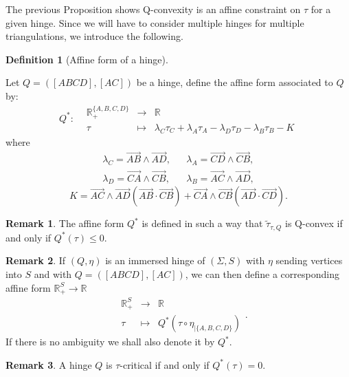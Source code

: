 \documentclass[a4paper,12pt]{article}
\def\RR{\mathbb{R}}
\newcommand{\function}[5]{\displaystyle#1:\begin{array}{l|rcl}
& \displaystyle #2 & \longrightarrow & \displaystyle #3 \\
	& \displaystyle #4 & \longmapsto & \displaystyle #5 \end{array}}
\newcommand{\functionn}[4]{\displaystyle\begin{array}{l|rcl}
& \displaystyle #1 & \longrightarrow & \displaystyle #2 \\
	& \displaystyle #3 & \longmapsto & \displaystyle #4 \end{array}}
\newcommand{\tautilde}[2]{\widetilde\tau_{#1,#2}}
\theoremstyle{definition}
\newtheorem{defi}[lem]{Definition}	%
\newtheorem*{rem}{Remark}			 %
\begin{document}
						The previous Proposition shows Q-convexity is an affine constraint on $\tau$ for a given hinge. Since we will have to consider multiple hinges for multiple triangulations, we introduce the following.
						\begin{defi}[Affine form of a hinge] \label{defi:Q_forme_affine}

							Let $Q=([ABCD],[AC])$ be a hinge, define the affine form associated to $Q$ by:
							$$\function{Q^*}{\RR_+^{\{A,B,C,D\}}}{\RR}{\tau}{
								 \lambda_C\tau_C+
								 \lambda_A\tau_A
									-\lambda_D\tau_D-
									\lambda_B\tau_B-K
								 }
							$$
							where
							\begin{eqnarray*}
							 \lambda_C=\overrightarrow{AB}\wedge\overrightarrow{AD},&&\lambda_A=\overrightarrow{CD} \wedge\overrightarrow{CB},\\
							 \lambda_D=\overrightarrow{CA}\wedge \overrightarrow{CB},&&\lambda_B=\overrightarrow{AC}\wedge \overrightarrow{AD},
							\end{eqnarray*}
							 $$K= \overrightarrow{AC}\wedge \overrightarrow{AD}
								\left(\overrightarrow{AB}\cdot \overrightarrow{CB}\right)
							 +
							 \overrightarrow{CA}\wedge \overrightarrow{CB}
								\left(\overrightarrow{AD}\cdot \overrightarrow{CD}\right).$$
	
						
						
						\end{defi}
						\begin{rem}\label{rem:forme_linaire_Qconvexe} The affine form $Q^*$ is defined in such a way that $\tautilde{\tau}{Q}$
						is Q-convex if and only if $Q^*(\tau)\leq 0$.
						\end{rem}


						\begin{rem}\label{rem:immersed_hinge_sending_vertices}
						 If $(Q,\eta)$ is an immersed hinge of $(\Sigma, S)$ with $\eta$ sending vertices into $S$
						 and with $Q=([ABCD],[AC])$,
						 we can then define a corresponding affine form $\RR_+^{S}\rightarrow \RR$
						 $$\functionn{\RR_+^S}{\RR}{\tau}{Q^*(\tau\circ \eta_{|\{A,B,C,D\} }) }.$$
						 If there is no ambiguity we shall also denote it by $Q^*$.
						\end{rem}
						\begin{rem}\label{rem:hinge_critical_only} A hinge $Q$ is $\tau$-critical if and only if $Q^*(\tau)=0$.

						\end{rem}
\end{document}
